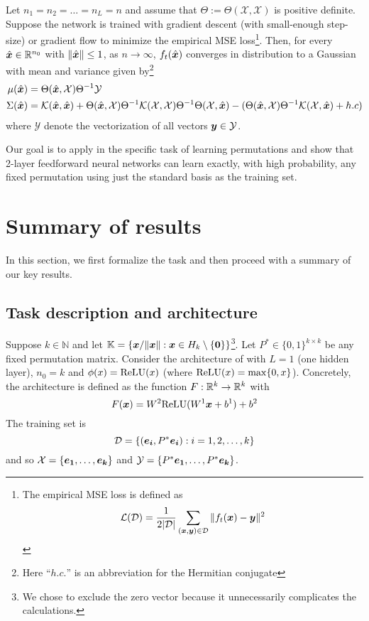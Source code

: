 \begin{theorem}
\label{thm:output}
    Let $n_1=n_2=\dots=n_L =n$ and assume that $\Theta:=\Theta(\mathcal{X},\mathcal{X})$ is positive definite. Suppose the network is trained with gradient descent (with small-enough step-size) or gradient flow to minimize the empirical MSE loss\footnote{The empirical MSE loss is defined as $$\mathcal{L}(\mathcal{D})=\frac{1}{2|\mathcal{D}|} \sum_{(\boldsymbol{x},\boldsymbol{y})\in \mathcal{D}} \|f_t(\boldsymbol{x})-\boldsymbol{y}\|^2$$}. Then, for every $\hat{\boldsymbol{x}} \in \mathbb{R}^{n_0}$ with $\|\hat{\boldsymbol{x}}\| \leq 1$, as $n\to \infty$, $f_t(\hat{\boldsymbol{x}})$ converges in distribution to a Gaussian with mean and variance given by\footnote{Here ``$h.c.$'' is an abbreviation for the Hermitian conjugate}
    \begin{align}
        \mu(\hat{\boldsymbol{x}}) &= \Theta(\hat{\boldsymbol{x}}, \mathcal{X})\Theta^{-1}\mathcal{Y} \label{eq:mean_out} \\
        \Sigma(\hat{\boldsymbol{x}}) &= \mathcal{K}(\hat{\boldsymbol{x}},\hat{\boldsymbol{x}})+ \Theta(\hat{\boldsymbol{x}},\mathcal{X})\Theta^{-1}\mathcal{K}(\mathcal{X}, \mathcal{X}) \Theta^{-1} \Theta(\mathcal{X}, \hat{\boldsymbol{x}}) - (\Theta(\hat{\boldsymbol{x}}, \mathcal{X})\Theta^{-1}\mathcal{K}(\mathcal{X}, \hat{\boldsymbol{x}}) + h.c) \label{eq:var_out}
    \end{align}
    where $\mathcal{Y}$ denote the vectorization of all vectors $\boldsymbol{y} \in \mathcal{Y}$.
\end{theorem}

Our goal is to apply  in the specific task of learning permutations and show that 2-layer feedforward neural networks can learn exactly, with high probability, any fixed permutation using just the standard basis as the training set.

\section{Summary of results}
\label{sec:desc}
In this section, we first formalize the task and then proceed with a summary of our key results.

\subsection{Task description and architecture}
Suppose $k \in \mathbb{N}$ and let $\mathbb{K} = \left\{\boldsymbol{x}/\|\boldsymbol{x}\| : \boldsymbol{x} \in H_{k}\setminus \{\boldsymbol{0}\} \right\}$\footnote{We chose to exclude the zero vector because it unnecessarily complicates the calculations.}. Let $P^* \in \{0,1\}^{k \times k}$ be any fixed permutation matrix. Consider the architecture of  with $L = 1$ (one hidden layer), $n_0 = k$ and $\phi(x) = \mathrm{ReLU}(x)$ (where $\mathrm{ReLU}(x) = \max\{0, x\}$). Concretely, the architecture is defined as the function $F: \mathbb{R}^{k} \to \mathbb{R}^{k}$ with  
$$F(\boldsymbol{x}) = W^2\mathrm{ReLU}(W^1 \boldsymbol{x} + b^1) + b^2$$
The training set is 
$$\mathcal{D} = \{(\boldsymbol{e_i}, P^*\boldsymbol{e_i}):i=1,2,\dots, k\}$$ 
and so $\mathcal{X} = \{\boldsymbol{e_1}, \dots, \boldsymbol{e_k}\}$ and $\mathcal{Y} = \{P^*\boldsymbol{e_1}, \dots, P^*\boldsymbol{e_k}\}$. 

